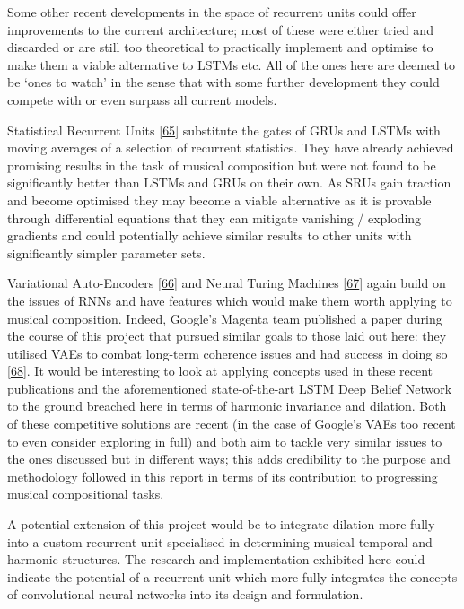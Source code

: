 \documentclass[12pt,]{article}
\begin{document}
Some other recent developments in the space of recurrent units could
offer improvements to the current architecture; most of these were
either tried and discarded or are still too theoretical to practically
implement and optimise to make them a viable alternative to LSTMs etc.
All of the ones here are deemed to be `ones to watch' in the sense that
with some further development they could compete with or even surpass
all current models.

Statistical Recurrent Units
{[}\protect\hyperlink{ref-oliva2017statistical}{65}{]} substitute the
gates of GRUs and LSTMs with moving averages of a selection of recurrent
statistics. They have already achieved promising results in the task of
musical composition but were not found to be significantly better than
LSTMs and GRUs on their own. As SRUs gain traction and become optimised
they may become a viable alternative as it is provable through
differential equations that they can mitigate vanishing / exploding
gradients and could potentially achieve similar results to other units
with significantly simpler parameter sets.

Variational Auto-Encoders
{[}\protect\hyperlink{ref-roberts2017hierarchical}{66}{]} and Neural
Turing Machines {[}\protect\hyperlink{ref-graves2014neural}{67}{]} again
build on the issues of RNNs and have features which would make them
worth applying to musical composition. Indeed, Google's Magenta team
published a paper during the course of this project that pursued similar
goals to those laid out here: they utilised VAEs to combat long-term
coherence issues and had success in doing so
{[}\protect\hyperlink{ref-roberts2018hierarchical}{68}{]}. It would be
interesting to look at applying concepts used in these recent
publications and the aforementioned state-of-the-art LSTM Deep Belief
Network to the ground breached here in terms of harmonic invariance and
dilation. Both of these competitive solutions are recent (in the case of
Google's VAEs too recent to even consider exploring in full) and both
aim to tackle very similar issues to the ones discussed but in different
ways; this adds credibility to the purpose and methodology followed in
this report in terms of its contribution to progressing musical
compositional tasks.

A potential extension of this project would be to integrate dilation
more fully into a custom recurrent unit specialised in determining
musical temporal and harmonic structures. The research and
implementation exhibited here could indicate the potential of a
recurrent unit which more fully integrates the concepts of convolutional
neural networks into its design and formulation.
\end{document}
